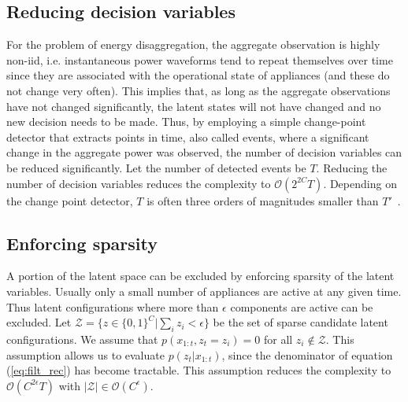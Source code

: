 \subsection{Reducing decision variables}
For the problem of energy disaggregation, the aggregate observation is highly non-iid, i.e. instantaneous power waveforms tend to repeat themselves over time since they are associated with the operational state of appliances (and these do not change very often). This implies that, as long as the aggregate observations have not changed significantly, the latent states will not have changed and no new decision needs to be made. Thus, by employing a simple change-point detector that extracts points in time, also called events, where a significant change in the aggregate power was observed, the number of decision variables can be reduced significantly. Let the number of detected events be $T$. Reducing the number of decision variables reduces the complexity to $\mathcal{O}(2^{2C}T)$. Depending on the change point detector, $T$ is often three orders of magnitudes smaller than $T'$~\cite{wild2015new}.

\subsection{Enforcing sparsity}
A portion of the latent space can be excluded by enforcing sparsity of the latent variables. Usually only a small number of appliances are active at any given time. Thus latent configurations where more than $\epsilon$ components are active can be excluded. Let $\mathcal{Z} = \{z \in \{0,1\}^C|\sum_i z_i < \epsilon \}$ be the set of sparse candidate latent configurations. We assume that $p(x_{1:t}, z_t = z_i) = 0$ for all $z_i \notin \mathcal{Z}$. This assumption allows us to evaluate $p(z_t|x_{1:t})$, since the denominator of equation (\ref{eq:filt_rec}) has become tractable. This assumption reduces the complexity to $\mathcal{O}(C^{2\epsilon}T)$ with $|\mathcal{Z}| \in \mathcal{O}(C^{\epsilon})$.

